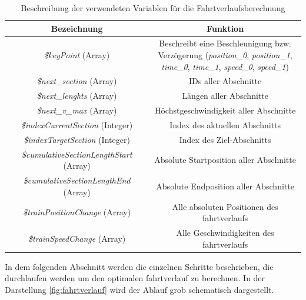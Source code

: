 \begin{table}
\begin{center}
\renewcommand{\arraystretch}{1.2}
\begin{tabular}{c|c}
Bezeichnung & Funktion \\ \hline
\textit{\$keyPoint} (Array)                   			&   \makecell{Beschreibt eine Beschleunigung bzw.\\Verzögerung (\textit{position\_0}, \textit{position\_1},\\ \textit{time\_0}, \textit{time\_1}, \textit{speed\_0}, \textit{speed\_1})}           \\ \hline
\textit{\$next\_section} (Array)                  		&    IDs aller Abschnitte                  \\ \hline
\textit{\$next\_lenghts} (Array)                  		&    Längen aller Abschnitte                  \\ \hline
\textit{\$next\_v\_max} (Array)                  		&    Höchstgeschwindigkeit aller Abschnitte                  \\ \hline
\textit{\$indexCurrentSection} (Integer)             	&    Index des aktuellen Abschnitts               \\ \hline
\textit{\$indexTargetSection} (Integer)               	&    Index des Ziel-Abschnitts                  \\ \hline
\textit{\$cumulativeSectionLengthStart} (Array) 	&    Absolute Startposition aller Abschnitte                  \\ \hline
\textit{\$cumulativeSectionLengthEnd} (Array)  	&    Absolute Endposition aller Abschnitte                  \\ \hline
\textit{\$trainPositionChange} (Array)                	&    Alle absoluten Positionen des \Gls{fahrtverlauf}s                  \\ \hline
\textit{\$trainSpeedChange} (Array)                  	&   Alle Geschwindigkeiten des \Gls{fahrtverlauf}s                  \\
\end{tabular}
\renewcommand{\arraystretch}{1}
\caption{Beschreibung der verwendeten Variablen für die Fahrtverlaufsberechnung}
\label{table:vars}
\end{center}
\end{table}
In dem folgenden Abschnitt werden die einzelnen Schritte beschrieben, die durchlaufen werden um den optimalen \Gls{fahrtverlauf} zu berechnen. In der Darstellung \ref{fig:fahrtverlauf} wird der Ablauf grob schematisch dargestellt.
